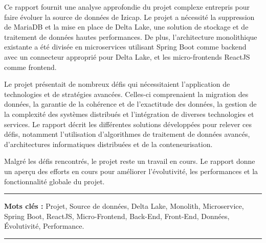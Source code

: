 \resume






Ce rapport fournit une analyse approfondie du projet complexe entrepris pour faire évoluer la source de données de Izicap. Le projet a nécessité la suppression de MariaDB et la mise en place de Delta Lake, une solution de stockage et de traitement de données hautes performances. De plus, l'architecture monolithique existante a été divisée en microservices utilisant Spring Boot comme backend avec un connecteur approprié pour Delta Lake, et les micro-frontends ReactJS comme frontend.

\medskip

Le projet présentait de nombreux défis qui nécessitaient l'application de technologies et de stratégies avancées. Celles-ci comprenaient la migration des données, la garantie de la cohérence et de l'exactitude des données, la gestion de la complexité des systèmes distribués et l'intégration de diverses technologies et services. Le rapport décrit les différentes solutions développées pour relever ces défis, notamment l'utilisation d'algorithmes de traitement de données avancés, d'architectures informatiques distribuées et de la conteneurisation.

\medskip

Malgré les défis rencontrés, le projet reste un travail en cours. Le rapport donne un aperçu des efforts en cours pour améliorer l'évolutivité, les performances et la fonctionnalité globale du projet.

\vspace{1cm}


\noindent\rule[2pt]{\textwidth}{0.5pt}

{\textbf{Mots clés :}}
Projet, Source de données, Delta Lake, Monolith, Microservice, Spring Boot, ReactJS, Micro-Frontend, Back-End, Front-End, Données, Évolutivité, Performance.
\\
\noindent\rule[2pt]{\textwidth}{0.5pt}

\clearpage

